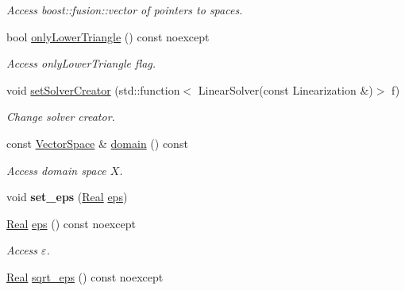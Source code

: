 \begin{DoxyCompactItemize}
\begin{DoxyCompactList}\small\item\em \-Access boost\-::fusion\-::vector of pointers to spaces. \end{DoxyCompactList}\item 
bool \hyperlink{classSpacy_1_1Kaskade_1_1C2Functional_a37152b2b1413e611d229a61318b86768}{only\-Lower\-Triangle} () const noexcept
\begin{DoxyCompactList}\small\item\em \-Access only\-Lower\-Triangle flag. \end{DoxyCompactList}\item 
void \hyperlink{classSpacy_1_1Kaskade_1_1C2Functional_ac9496fdef4f38eb466d5b5b58089be8b}{set\-Solver\-Creator} (std\-::function$<$ \-Linear\-Solver(const \-Linearization \&)$>$ f)
\begin{DoxyCompactList}\small\item\em \-Change solver creator. \end{DoxyCompactList}\item 
\hypertarget{classSpacy_1_1FunctionalBase_a2d3397deb9fa1ad85ed04e37a03b3aa6}{const \hyperlink{classSpacy_1_1VectorSpace}{\-Vector\-Space} \& \hyperlink{classSpacy_1_1FunctionalBase_a2d3397deb9fa1ad85ed04e37a03b3aa6}{domain} () const }\label{classSpacy_1_1FunctionalBase_a2d3397deb9fa1ad85ed04e37a03b3aa6}

\begin{DoxyCompactList}\small\item\em \-Access domain space $X$. \end{DoxyCompactList}\item 
\hypertarget{classSpacy_1_1Mixin_1_1Eps_a818ab6dfab5e4eea583e1302bcc621f8}{void {\bfseries set\-\_\-eps} (\hyperlink{classSpacy_1_1Real}{\-Real} \hyperlink{classSpacy_1_1Mixin_1_1Eps_a812b99b0abc1d78a34b4114907f23f52}{eps})}\label{classSpacy_1_1Mixin_1_1Eps_a818ab6dfab5e4eea583e1302bcc621f8}

\item 
\hypertarget{classSpacy_1_1Mixin_1_1Eps_a812b99b0abc1d78a34b4114907f23f52}{\hyperlink{classSpacy_1_1Real}{\-Real} \hyperlink{classSpacy_1_1Mixin_1_1Eps_a812b99b0abc1d78a34b4114907f23f52}{eps} () const noexcept}\label{classSpacy_1_1Mixin_1_1Eps_a812b99b0abc1d78a34b4114907f23f52}

\begin{DoxyCompactList}\small\item\em \-Access $\varepsilon$. \end{DoxyCompactList}\item 
\hypertarget{classSpacy_1_1Mixin_1_1Eps_a1c1b0ed7f14ed4967dc7da9295a136d4}{\hyperlink{classSpacy_1_1Real}{\-Real} \hyperlink{classSpacy_1_1Mixin_1_1Eps_a1c1b0ed7f14ed4967dc7da9295a136d4}{sqrt\-\_\-eps} () const noexcept}\label{classSpacy_1_1Mixin_1_1Eps_a1c1b0ed7f14ed4967dc7da9295a136d4}


\end{DoxyCompactItemize}
